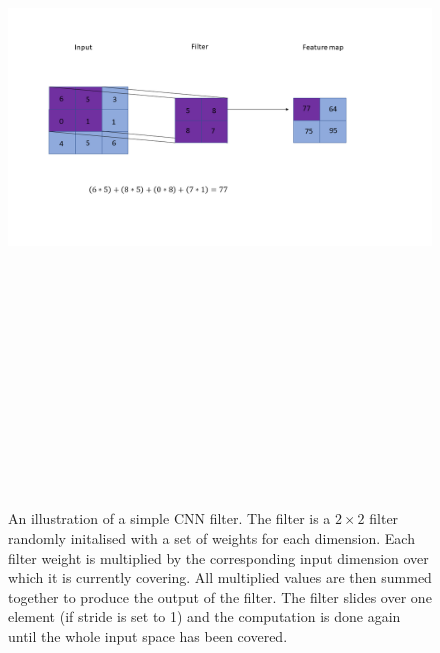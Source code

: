 \begin{figure}
    \centering
    \includegraphics[width=17cm,height=20cm,keepaspectratio]{figures/cnn_filter_illustration.png}
    \caption[Convolutional neural network filter illustration.]{An illustration of a simple \ac{CNN} filter. The filter is a $2 \times 2$ filter randomly initalised with a set of weights for each dimension. Each filter weight is multiplied by the corresponding input dimension over which it is currently covering. All multiplied values are then summed together to produce the output of the filter. The filter slides over one element (if stride is set to 1) and the computation is done again until the whole input space has been covered.}
    \label{fig:cnn_filter_illustration}
\end{figure}

